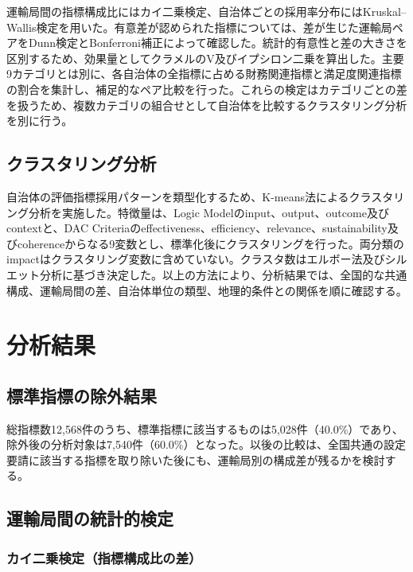 運輸局間の指標構成比にはカイ二乗検定、自治体ごとの採用率分布にはKruskal--Wallis検定を用いた。有意差が認められた指標については、差が生じた運輸局ペアをDunn検定とBonferroni補正によって確認した。統計的有意性と差の大きさを区別するため、効果量としてクラメルのV及びイプシロン二乗を算出した。主要9カテゴリとは別に、各自治体の全指標に占める財務関連指標と満足度関連指標の割合を集計し、補足的なペア比較を行った。これらの検定はカテゴリごとの差を扱うため、複数カテゴリの組合せとして自治体を比較するクラスタリング分析を別に行う。

\subsection{クラスタリング分析}

自治体の評価指標採用パターンを類型化するため、K-means法によるクラスタリング分析を実施した。特徴量は、Logic Modelのinput、output、outcome及びcontextと、DAC Criteriaのeffectiveness、efficiency、relevance、sustainability及びcoherenceからなる9変数とし、標準化後にクラスタリングを行った。両分類のimpactはクラスタリング変数に含めていない。クラスタ数はエルボー法及びシルエット分析に基づき決定した。以上の方法により、分析結果では、全国的な共通構成、運輸局間の差、自治体単位の類型、地理的条件との関係を順に確認する。

\section{分析結果}
\label{sec:ch6_results}

\subsection{標準指標の除外結果}

総指標数12,568件のうち、標準指標に該当するものは5,028件（40.0\%）であり、除外後の分析対象は7,540件（60.0\%）となった。以後の比較は、全国共通の設定要請に該当する指標を取り除いた後にも、運輸局別の構成差が残るかを検討する。

\subsection{運輸局間の統計的検定}

\subsubsection{カイ二乗検定（指標構成比の差）}

